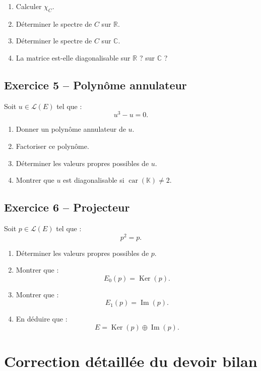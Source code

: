 \documentclass[11pt,a4paper]{article}
\newcommand{\K}{\mathbb K}
\newcommand{\R}{\mathbb R}
\newcommand{\C}{\mathbb C}
\newcommand{\Lcal}{\mathcal L}
\newcommand{\Ker}{\operatorname{Ker}}
\newcommand{\Imf}{\operatorname{Im}}
\begin{document}
\begin{enumerate}
    \item Calculer \(\chi_C\).
    \item Déterminer le spectre de \(C\) sur \(\R\).
    \item Déterminer le spectre de \(C\) sur \(\C\).
    \item La matrice est-elle diagonalisable sur \(\R\) ? sur \(\C\) ?
\end{enumerate}

\subsection*{Exercice 5 -- Polynôme annulateur}

Soit \(u\in\Lcal(E)\) tel que :
\[
u^3-u=0.
\]

\begin{enumerate}
    \item Donner un polynôme annulateur de \(u\).
    \item Factoriser ce polynôme.
    \item Déterminer les valeurs propres possibles de \(u\).
    \item Montrer que \(u\) est diagonalisable si \(\operatorname{car}(\K)\neq2\).
\end{enumerate}

\subsection*{Exercice 6 -- Projecteur}

Soit \(p\in\Lcal(E)\) tel que :
\[
p^2=p.
\]

\begin{enumerate}
    \item Déterminer les valeurs propres possibles de \(p\).
    \item Montrer que :
    \[
    E_0(p)=\Ker(p).
    \]
    \item Montrer que :
    \[
    E_1(p)=\Imf(p).
    \]
    \item En déduire que :
    \[
    E=\Ker(p)\oplus\Imf(p).
    \]
\end{enumerate}

\newpage

\section{Correction détaillée du devoir bilan}
\end{document}
